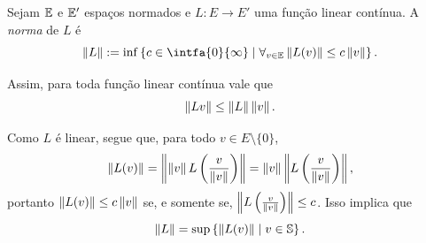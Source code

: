\begin{defi}
Sejam $\mathbb{E}$ e $\mathbb{E}'$ espaços normados e $L\colon E \to E'$ uma função linear contínua. A \emph{norma} de $L$ é
	\begin{equation*}
	\nor{L} := \inf\set{c \in \intfa{0}{\infty}}{\forall_{v \in \E} \nor{L(v)} \leq c\nor{v}}.
	\end{equation*}
\end{defi}

Assim, para toda função linear contínua vale que
	\begin{equation*}
	\left\Vert{Lv}\right\Vert \leq \left\Vert{L}\right\Vert\left\Vert{v}\right\Vert.
	\end{equation*}

Como $L$ é linear, segue que, para todo $v \in E\setminus\{0\}$,
	\begin{equation*}
	\left\Vert{L(v)}\right\Vert = \left\Vert{\left\Vert{v}\right\Vert L\left(\frac{v}{\left\Vert{v}\right\Vert}\right)}\right\Vert = \left\Vert{v}\right\Vert\left\Vert{L\left(\frac{v}{\left\Vert{v}\right\Vert}\right)}\right\Vert,
	\end{equation*}
portanto $\left\Vert{L(v)}\right\Vert \leq c\left\Vert{v}\right\Vert$ se, e somente se, $\left\Vert{L\left(\frac{v}{\left\Vert{v}\right\Vert}\right)}\right\Vert \leq c$. Isso implica que
	\begin{equation*}
	\left\Vert{L}\right\Vert = \sup\left\{\left\Vert{L(v)}\right\Vert \;\middle\vert\; v \in \mathbb{S} \right\}.
	\end{equation*}

